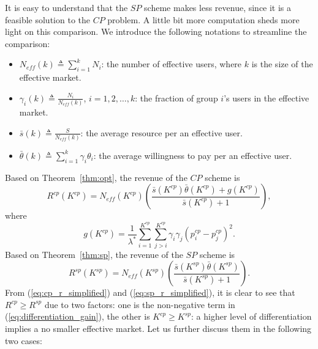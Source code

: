 \documentclass[twocolumn,10pt,twosided]{IEEEtran}
\begin{document}
It is easy to understand that the $SP$ scheme makes less revenue, since it is a feasible solution to the $CP$ problem. A little bit more computation sheds more light on this comparison.
We introduce the following notations to streamline the comparison:
\begin{itemize}
    \item $N_{eff}(k) \triangleq \sum\limits_{i=1}^k N_i$: the number of effective users, where $k$ is the size of the effective market.
     \item $\gamma_i(k)\triangleq \frac{N_i}{N_{eff}(k)}$, $i=1,2,\dots,k$: the fraction of group $i$'s users in the  effective market.
     \item $\bar{s}(k)\triangleq \frac{S}{N_{eff}(k)}$: the average resource per an effective user.
     \item $\bar{\theta}(k) \triangleq \sum\limits_{i=1}^k \gamma_i\theta_i$: the average willingness to pay per an effective user.
\end{itemize}
Based on Theorem~\ref{thm:opt},  the revenue of the $CP$ scheme is
\begin{equation}
\label{eq:cp_r_simplified}
R^{cp}(K^{cp})= N_{eff}(K^{cp})\! \left(\frac{\bar{s}(K^{cp})\bar{\theta}(K^{cp})+g(K^{cp})}{\bar{s}(K^{cp})+1}\right)\!,
\end{equation}
where
\begin{equation}
\label{eq:differentiation_gain}
    g(K^{cp})=\frac{1}{\lambda^*}\sum\limits_{i=1}^{K^{cp}}\sum\limits_{j>i}^{K^{cp}} \gamma_i \gamma_j(p^{cp}_i-p^{cp}_j)^2.
\end{equation}
Based on Theorem~\ref{thm:sp}, the revenue of the $SP$ scheme is
\begin{equation}
\label{eq:sp_r_simplified}
R^{sp}(K^{sp})= N_{eff}(K^{sp}) \left(\frac{\bar{s}(K^{sp})\bar{\theta}(K^{sp})}{\bar{s}(K^{sp})+1}\right).
\end{equation}
From (\ref{eq:cp_r_simplified}) and (\ref{eq:sp_r_simplified}), it is clear to see that $R^{cp}\ge R^{sp}$ due to two factors: one is the non-negative term in (\ref{eq:differentiation_gain}), the other is $K^{cp}\ge K^{sp}$: a higher level of differentiation implies a no smaller effective market. Let us further discuss them in the following two cases:
\end{document}
